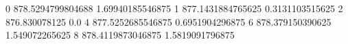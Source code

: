 0 878.5294799804688 1.69940185546875
1 877.1431884765625 0.3131103515625
2 876.830078125 0.0
4 877.5252685546875 0.6951904296875
6 878.379150390625 1.549072265625
8 878.4119873046875 1.5819091796875

